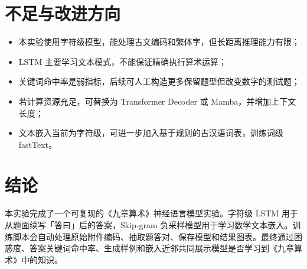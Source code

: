 \documentclass[a4paper,10pt,twocolumn]{article}
\begin{document}
\section{不足与改进方向}
\begin{itemize}
  \item 本实验使用字符级模型，能处理古文编码和繁体字，但长距离推理能力有限；
  \item LSTM 主要学习文本模式，不能保证精确执行算术运算；
  \item 关键词命中率是弱指标，后续可人工构造更多保留题型但改变数字的测试题；
  \item 若计算资源充足，可替换为 Transformer Decoder 或 Mamba，并增加上下文长度；
  \item 文本嵌入当前为字符级，可进一步加入基于规则的古汉语词表，训练词级 fastText。
\end{itemize}

\section{结论}
本实验完成了一个可复现的《九章算术》神经语言模型实验。字符级 LSTM 用于从题面续写「答曰」后的答案，Skip-gram 负采样模型用于学习数学文本嵌入。训练脚本会自动处理原始附件编码、抽取题答对、保存模型和结果图表。最终通过困惑度、答案关键词命中率、生成样例和嵌入近邻共同展示模型是否学习到《九章算术》中的知识。
\end{document}
